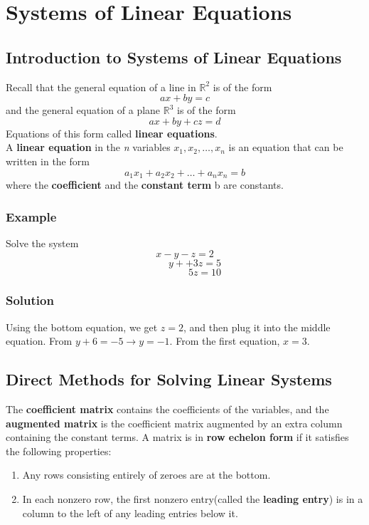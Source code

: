 \setcounter{chapter}{1}
\chapter{Systems of Linear Equations}

\section{Introduction to Systems of Linear Equations}
Recall that the general equation of a line in $\mathbb{R}^2$ is of the form
$$ax+by = c$$ and the general equation of a plane $\mathbb{R}^3$ is of the form
$$ax+by+cz = d$$ Equations of this form called \textbf{linear equations}.\\

A \textbf{linear equation} in the \textit{n} variables $x_1, x_2, \dots, x_n$ is an equation that can be written in the form
$$a_1x_1+a_2x_2+\dots+a_nx_n = b$$ where the \textbf{coefficient} and the \textbf{constant term} b are constants.

\subsection*{Example}
Solve the system
$$x - y - z = 2$$
$$\qquad y+ + 3z = 5$$
$$\qquad\qquad 5z = 10$$

\subsection*{Solution}
Using the bottom equation, we get $z = 2$, and then plug it into the middle equation. From $y+6 = -5\rightarrow y = -1$. From the first equation, $x = 3$.

\section{Direct Methods for Solving Linear Systems}
The \textbf{coefficient matrix} contains the coefficients of the variables, and the \textbf{augmented matrix} is the coefficient matrix augmented by an extra column containing the constant terms.
A matrix is in \textbf{row echelon form} if it satisfies the following properties:
\begin{enumerate}
    \item Any rows consisting entirely of zeroes are at the bottom.
    \item In each nonzero row, the first nonzero entry(called the \textbf{leading entry}) is in a column to the left of any leading entries below it. 
\end{enumerate}

